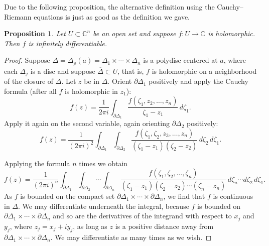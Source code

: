 \documentclass[12pt,openany]{book}
\newcommand{\C}{{\mathbb{C}}}
\theoremstyle{plain}
\newtheorem{prop}[thm]{Proposition}
\theoremstyle{remark}
\theoremstyle{definition}
\theoremstyle{exercise}
\theoremstyle{example}
\begin{document}
Due to the following proposition, the alternative definition using the
Cauchy--Riemann equations is just as good as the definition we gave.

\begin{prop}
Let $U \subset \C^n$ be an open set and
suppose $f \colon U \to \C$ is holomorphic.  Then $f$ is infinitely
differentiable.
\end{prop}

\begin{proof}
Suppose $\Delta = \Delta_{\rho}(a) = \Delta_1 \times \cdots \times \Delta_n$
is a polydisc centered at $a$, where each $\Delta_j$ is a disc
and suppose $\overline{\Delta} \subset U$, that is, $f$ is holomorphic
on a neighborhood of the closure of $\Delta$.
Let $z$ be in $\Delta$.
Orient $\partial \Delta_1$ positively and
apply the Cauchy formula (after all $f$ is holomorphic in $z_1$):
\begin{equation*}
f(z) =
\frac{1}{2\pi i}
\int_{\partial \Delta_1}
\frac{f(\zeta_1,z_2,\ldots,z_n)}{\zeta_1-z_1}
\,
d \zeta_1 .
\end{equation*}
Apply it again on the second variable, again orienting
$\partial \Delta_2$ positively:
\begin{equation*}
f(z) =
\frac{1}{{(2\pi i)}^2}
\int_{\partial \Delta_1}
\int_{\partial \Delta_2}
\frac{f(\zeta_1,\zeta_2,z_3,\ldots,z_n)}{(\zeta_1-z_1)(\zeta_2-z_2)}
\,
d \zeta_2
\,
d \zeta_1 .
\end{equation*}

Applying the formula $n$ times we obtain
\begin{equation} \label{iteratedcauchy:eq}
f(z) =
\frac{1}{{(2\pi i)}^n}
\int_{\partial \Delta_1}
\int_{\partial \Delta_2}
\cdots
\int_{\partial \Delta_n}
\frac{f(\zeta_1,\zeta_2,\ldots,\zeta_n)}{(\zeta_1-z_1)(\zeta_2-z_2)\cdots(\zeta_n-z_n)}
\,
d \zeta_n
\cdots
d \zeta_2
\,
d \zeta_1 .
\end{equation}
As $f$ is bounded on the compact set
$\partial \Delta_1 \times \cdots \times \partial \Delta_n$,
we find that $f$ is continuous in $\Delta$.
We may differentiate underneath the
integral, because $f$ is bounded on 
$\partial \Delta_1 \times \cdots \times \partial \Delta_n$
and so are the derivatives of the integrand
with respect to $x_j$ and $y_j$, where $z_j=x_j+i y_j$, as long as
$z$ is a positive distance away from
$\partial \Delta_1 \times \cdots \times \partial \Delta_n$.
We may differentiate as many times as we wish.
\end{proof}
\end{document}
